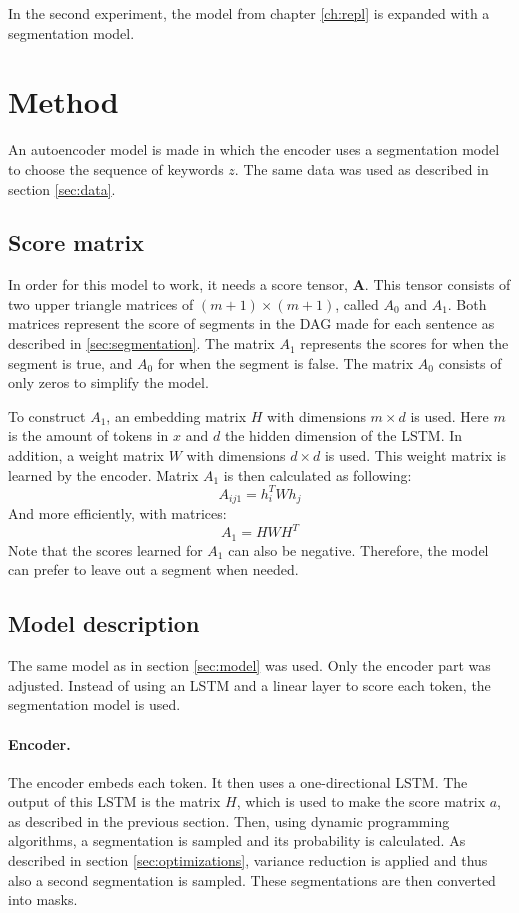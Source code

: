 In the second experiment, the model from chapter \ref{ch:repl} is expanded with a segmentation model. 

\section{Method}
An autoencoder model is made in which the encoder uses a segmentation model to choose the sequence of keywords $z$.
The same data was used as described in section \ref{sec:data}.

\subsection{Score matrix}
In order for this model to work, it needs a score tensor, $\boldsymbol{A}$.
This tensor consists of two upper triangle matrices of $(m+1) \times (m+1)$, called $A_0$ and $A_1$.
Both matrices represent the score of segments in the DAG made for each sentence as described in \ref{sec:segmentation}. 
The matrix $A_1$ represents the scores for when the segment is true, and $A_0$ for when the segment is false.
The matrix $A_0$ consists of only zeros to simplify the model.

To construct $A_1$, an embedding matrix $H$ with dimensions $m \times d$ is used.
Here $m$ is the amount of tokens in $x$ and $d$ the hidden dimension of the LSTM.
In addition, a weight matrix $W$ with dimensions $d \times d$ is used.
This weight matrix is learned by the encoder. 
Matrix $A_1$ is then calculated as following:
\begin{equation}
    A_{ij1} = h_i^T W h_j
\end{equation}
And more efficiently, with matrices:
\begin{equation}
    A_1 = H W H^T
\end{equation}
Note that the scores learned for $A_1$ can also be negative. 
Therefore, the model can prefer to leave out a segment when needed.

\subsection{Model description}
The same model as in section \ref{sec:model} was used. 
Only the encoder part was adjusted.
Instead of using an LSTM and a linear layer to score each token, the segmentation model is used.

\paragraph{Encoder.}
The encoder embeds each token. 
It then uses a one-directional LSTM. 
The output of this LSTM is the matrix $H$, which is used to make the score matrix $a$, as described in the previous section. 
Then, using dynamic programming algorithms, a segmentation is sampled and its probability is calculated. 
As described in section \ref{sec:optimizations}, variance reduction is applied and thus also a second segmentation is sampled.
These segmentations are then converted into masks.

